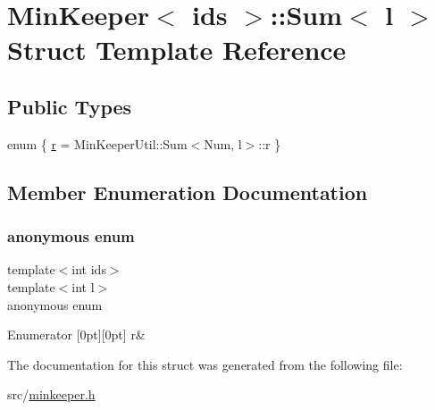 \hypertarget{structMinKeeper_1_1Sum}{}\section{Min\+Keeper$<$ ids $>$\+:\+:Sum$<$ l $>$ Struct Template Reference}
\label{structMinKeeper_1_1Sum}
\subsection*{Public Types}
\begin{DoxyCompactItemize}
\item 
enum \{ \hyperlink{structMinKeeper_1_1Sum_adce4c31739d72622c9de65c6d624b8aea5879f71c13fed43063fde60dc935dbf5}{r} = Min\+Keeper\+Util\+:\+:Sum$<$Num, l$>$\+:\+:r
 \}
\end{DoxyCompactItemize}


\subsection{Member Enumeration Documentation}
\mbox{\label{structMinKeeper_1_1Sum_adce4c31739d72622c9de65c6d624b8ae}} 
\subsubsection{\texorpdfstring{anonymous enum}{anonymous enum}}
{\footnotesize\ttfamily template$<$int ids$>$ \\
template$<$int l$>$ \\
anonymous enum}

\begin{DoxyEnumFields}{Enumerator}
[0pt][0pt]{}\mbox{\label{structMinKeeper_1_1Sum_adce4c31739d72622c9de65c6d624b8aea5879f71c13fed43063fde60dc935dbf5}} 
r&\\
\hline

\end{DoxyEnumFields}


The documentation for this struct was generated from the following file\+:\begin{DoxyCompactItemize}
\item 
src/\hyperlink{minkeeper_8h}{minkeeper.\+h}\end{DoxyCompactItemize}
